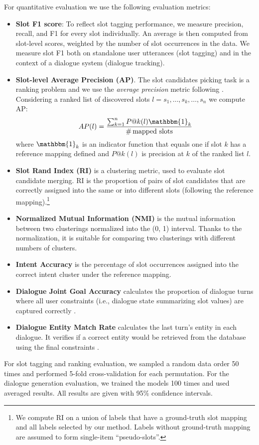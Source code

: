 For quantitative evaluation we use the following evaluation metrics:
\begin{itemize}[nosep,leftmargin=10pt]
    \item \textbf{Slot F1 score}: To reflect slot tagging performance, we measure precision, recall, and F1 for every slot individually.
    An average is then computed from slot-level scores, weighted by the number of slot occurrences in the data.
    We measure slot F1 both on standalone user utterances (slot tagging) and in the context of a dialogue system (dialogue tracking).
    \item \textbf{Slot-level Average Precision (AP)}. The slot candidates picking task is a ranking problem and we use the \textit{average precision} metric following \citet{chen2014leveraging}.
    Considering a ranked list of discovered slots $l = s_1, \dots, s_k, \dots, s_n$ we compute AP:
    \begin{equation}
        AP(l) = \frac{\sum_{k=1}^n P@k(l)\mathbbm{1}_k}{\mbox{\#\,mapped\ slots}}
    \end{equation}
    where $\mathbbm{1}_k$ is an indicator function that equals one if slot $k$ has a reference mapping defined and $P@k(l)$ is precision at $k$ of the ranked list $l$.
    \item \textbf{Slot Rand Index (RI)} is a clustering metric, used to evaluate slot candidate merging. RI is the proportion of pairs of slot candidates that are correctly assigned into the same or into different slots (following the reference mapping).\footnote{We compute RI on a union of labels that have a ground-truth slot mapping and all labels selected by our method. Labels without ground-truth mapping are assumed to form single-item “pseudo-slots”.}
    
    \item \textbf{Normalized Mutual Information (NMI)} is the mutual information between two clusterings normalized into the (0, 1) interval.
    Thanks to the normalization, it is suitable for comparing two clusterings with different numbers of clusters.

    
    \item \textbf{Intent Accuracy} is the percentage of slot occurrences assigned into the correct intent cluster under the reference mapping.
    \item \textbf{Dialogue Joint Goal Accuracy} calculates the proportion of dialogue turns where all user constraints (i.e., dialogue state summarizing slot values) are captured correctly \cite{mrkvsic2016neural}.
    
    \item \textbf{Dialogue Entity Match Rate} calculates the last turn's entity in each dialogue. It verifies if  a correct entity would be retrieved from the database using the final constraints \cite{wen2016network}.

\end{itemize}
For slot tagging and ranking evaluation, we sampled a random data order 50 times and performed 5-fold cross-validation for each permutation.
For the dialogue generation evaluation, we trained the models 100 times and used averaged results.
All results are given with 95\% confidence intervals.

